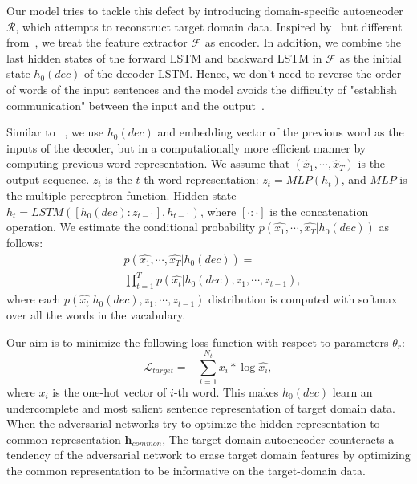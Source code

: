 \documentclass[11pt,letterpaper]{article}
\begin{document}
Our model tries to tackle this defect by introducing domain-specific autoencoder $\mathcal{R}$, which attempts to reconstruct target domain data. Inspired by~\cite{sutskever2014sequence} but different from~\cite{dai2015semi}, we treat the feature extractor $\mathcal{F}$ as encoder. In addition, we combine the last hidden states of the forward LSTM and backward LSTM in $\mathcal{F}$ as the initial state $h_0(dec)$ of the decoder LSTM. Hence, we don't need to reverse the order of words of the input sentences and the model avoids the difficulty of "establish communication" between the input and the output~\cite{sutskever2014sequence}.

Similar to ~\cite{zhanggenerating}, we use $h_0(dec)$ and embedding vector of the previous word as the inputs of the decoder, but in a computationally more efficient manner by computing previous word representation. We assume that $(\hat{x}_1,\cdots,\hat{x}_T)$ is the output sequence. $z_t$ is the $t$-th word representation: $z_t = MLP(h_t)$, and $MLP$ is the multiple perceptron function. Hidden state $h_t = LSTM([h_0(dec):z_{t-1}],h_{t-1})$, where $[\cdot:\cdot]$ is the concatenation operation. We estimate the conditional probability $p(\hat{x_1},\cdots,\hat{x_T}|h_0(dec))$ as follows:
\begin{equation}
\begin{aligned}
&p(\hat{x_1},\cdots,\hat{x_T}|h_0(dec))=\\
&\prod_{t=1}^Tp(\hat{x_t}|h_0(dec),z_1,\cdots,z_{t-1}),
\end{aligned}
\end{equation}
where each $p(\hat{x_t}|h_0(dec),z_1,\cdots,z_{t-1})$ distribution is computed with softmax over all the words in the vacabulary. 

Our aim is to minimize the following loss function with respect to parameters $\theta_r$:
\begin{equation}
\mathcal{L}_{target} = -\sum_{i=1}^{N_t}x_i*\log\hat{x_i},
\end{equation}
where $x_i$ is the one-hot vector of $i$-th word. This makes $h_0(dec)$ learn an undercomplete and most salient sentence representation of target domain data. When the adversarial networks try to optimize the hidden representation to common representation $\textbf{h}_{common}$, The target domain autoencoder counteracts a tendency of the adversarial network to erase target domain features by optimizing the common representation to be informative on the target-domain data.
\end{document}
